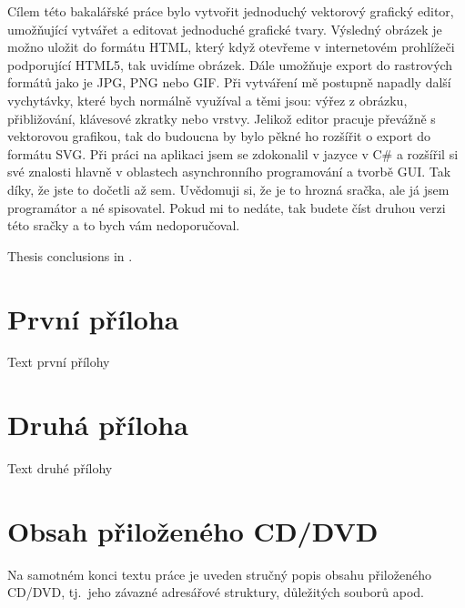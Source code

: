 \documentclass[
  field=inf,
  biblatex,
  glossaries,
  index
]{kidiplom}
\begin{document}
\begin{kiconclusions}
Cílem této bakalářské práce bylo vytvořit jednoduchý vektorový grafický editor, umožňující vytvářet a editovat jednoduché grafické tvary. Výsledný obrázek je možno uložit do formátu HTML, který když otevřeme v internetovém prohlížeči podporující HTML5, tak uvidíme obrázek. Dále umožňuje export do rastrových formátů jako je JPG, PNG nebo GIF. Při vytváření mě postupně napadly další vychytávky, které bych normálně využíval a těmi jsou: výřez z obrázku, přibližování, klávesové zkratky nebo vrstvy. Jelikož editor pracuje převážně s vektorovou grafikou, tak do budoucna by bylo pěkné ho rozšířit o export do formátu SVG. Při práci na aplikaci jsem se zdokonalil v jazyce v C# a rozšířil si své znalosti hlavně v oblastech asynchronního programování a tvorbě GUI. Tak díky, že jste to dočetli až sem. Uvědomuji si, že je to hrozná sračka, ale já jsem programátor a né spisovatel. Pokud mi to nedáte, tak budete číst druhou verzi této sračky a to bych vám nedoporučoval.

\end{kiconclusions}

\begin{kiconclusions}[english]
Thesis conclusions in .
\end{kiconclusions}

\appendix

\section{První příloha}
Text první přílohy

\section{Druhá příloha}
Text druhé přílohy

\section{Obsah přiloženého CD/DVD} \label{sec:ObsahCD}

Na samotném konci textu práce je uveden stručný popis obsahu
přiloženého CD/DVD, tj.~jeho závazné adresářové struktury, důležitých
souborů apod.
\end{document}
